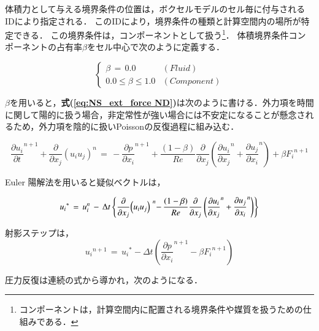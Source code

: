 体積力として与える境界条件の位置は，ボクセルモデルのセル毎に付与されるIDにより指定される．
このIDにより，境界条件の種類と計算空間内の場所が特定できる．
この境界条件は，コンポーネントとして扱う\footnote{コンポーネントは，計算空間内に配置される境界条件や媒質を扱うための仕組みである．}．
体積境界条件コンポーネントの占有率$\beta$をセル中心で次のように定義する．

\begin{equation}
\left \{
\begin{array}{ll}
\beta \,=\, 0.0 & (Fluid)\\
0.0\le \beta \le 1.0 & (Component) \end{array}
\right. 
\label{eq:component fraction}
\end{equation}

$\beta$を用いると，\textbf{式(\ref{eq:NS_ext_force ND})}は次のように書ける．外力項を時間に関して陽的に扱う場合，非定常性が強い場合には不安定になることが懸念されるため，外力項を陰的に扱いPoissonの反復過程に組み込む．

\begin{equation}
{\frac{\partial u_{i}}{\partial t}}^{n+1} + \frac{\partial}{\partial x_{j}}{\left({ u_{i} u_{j} }\right)}^{n}
\, =\,
- {\frac{\partial p}{\partial x_{i}}}^{n+1} + \frac{(1-\beta)}{Re} \frac{\partial}{\partial x_{j}} \left({ {\frac{\partial u_{i}}{\partial x_{j}}}^{n} + {\frac{\partial u_{j}}{\partial x_{i}}}^{n} }\right) + \beta {F_{i}}^{n+1}
\label{eq:NS_ext_force ND2}
\end{equation}

Euler 陽解法を用いると疑似ベクトルは，

\begin{equation}
{u_{i}}^{*}
\, =\, 
{u}_{i}^{n}\, -\,\mathrm{\Delta}{t} \left\{{ \frac{\mathrm{\partial}}{\mathrm{\partial}{x}_{j}}{\left({{u}_{i}{u}_{j}}\right)}^{\hspace{0.3em}{n}}\mathrm{{-}}\,\frac{(1-\beta)}{Re} \frac{\partial}{\partial x_{j}} \left({ {\frac{\partial u_{i}}{\partial x_{j}}}^{n} + {\frac{\partial u_{j}}{\partial x_{i}}}^{n} }\right) }\right\}
\label{eq:pseudo_vector forcing}
\end{equation}

射影ステップは，
\begin{equation}
{u_{i}}^{n+1} \,=\, {{u}_{i}}^{*} - \Delta{t} \left({ {\frac{\partial p}{\partial x_{i}}}^{n+1} - \beta {F_{i}}^{n+1} }\right)
\label{eq:projection forcing}
\end{equation}

圧力反復は連続の式から導かれ，次のようになる．

